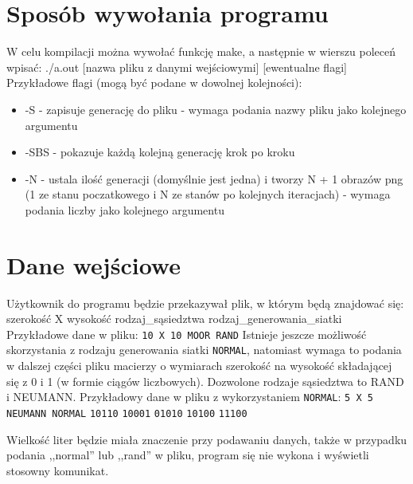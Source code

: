 \documentclass{article}
\begin{document}
\section{Sposób wywołania programu}
{\fontsize{14}{14}\selectfont 
W celu kompilacji można wywołać funkcję make,
a następnie w wierszu poleceń wpisać:
\newline
./a.out [nazwa pliku z danymi wejściowymi] [ewentualne flagi]
\newline
Przykładowe flagi (mogą być podane w dowolnej kolejności):
\begin{itemize}
\item -S - zapisuje generację do pliku - wymaga podania nazwy pliku jako kolejnego argumentu
\item -SBS - pokazuje każdą kolejną generację krok po kroku
\item -N - ustala ilość generacji (domyślnie jest jedna)  i tworzy N + 1 obrazów png (1 ze stanu poczatkowego i N ze stanów po kolejnych iteracjach) - wymaga podania liczby jako kolejnego argumentu
\end{itemize}
}

\section{Dane wejściowe}
{\fontsize{14}{14}\selectfont 
Użytkownik do programu będzie przekazywał plik, w którym będą znajdować się:
\newline
szerokość X wysokość rodzaj\_sąsiedztwa rodzaj\_generowania\_siatki
\newline
\newline
Przykładowe dane w pliku:
\newline
\texttt{10 X 10 MOOR RAND}
\newline
\newline
Istnieje jeszcze możliwość skorzystania z rodzaju generowania siatki \texttt{NORMAL}, natomiast wymaga to podania w dalszej części pliku macierzy o wymiarach szerokość na wysokość składającej się z 0 i 1 (w formie ciągów liczbowych).
\newline
\newline
Dozwolone rodzaje sąsiedztwa to RAND i NEUMANN.
\newline
\newline
Przykładowy dane w pliku z wykorzystaniem \texttt{NORMAL}:
\newline
\texttt{5 X 5 NEUMANN NORMAL}
\newline
\texttt{10110}
\newline
\texttt{10001}
\newline
\texttt{01010}
\newline
\texttt{10100}
\newline
\texttt{11100}
\newline

Wielkość liter będzie miała znaczenie przy podawaniu danych, także w przypadku podania ,,normal'' lub ,,rand'' w pliku, program się nie wykona i wyświetli stosowny komunikat.
}
\end{document}
